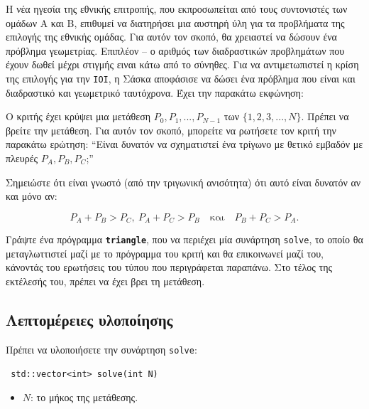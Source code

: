 \documentclass[12pt]{article}
\begin{document}
\renewcommand{\headerLang}{Ελληνικά}
\renewcommand{\problemName}{AB23. TRIANGLE}

\renewcommand{\headerLeft}{IATI Μέρα 2, Senior κατηγορία}
\renewcommand{\headerRightFirst}{XVII INTERNATIONAL ADVANCED TOURNAMENT IN INFORMATICS}
\renewcommand{\headerRightSecond}{ONLINE 2026}

\renewcommand{\tl}{$10$ sec.}
\renewcommand{\ml}{$1024$ MB}
\problem{Πρόβλημα \problemName}

Η νέα ηγεσία της εθνικής επιτροπής, που εκπροσωπείται από τους συντονιστές των ομάδων Α και Β, επιθυμεί να διατηρήσει μια αυστηρή ύλη για τα προβλήματα της επιλογής της εθνικής ομάδας. Για αυτόν τον σκοπό, θα χρειαστεί να δώσουν ένα πρόβλημα γεωμετρίας. Επιπλέον -- ο αριθμός των διαδραστικών προβλημάτων που έχουν δωθεί μέχρι στιγμής ειναι κάτω από το σύνηθες. Για να αντιμετωπιστεί η κρίση της επιλογής για την \texttt{IOI}, η Σάσκα αποφάσισε να δώσει ένα πρόβλημα που είναι και διαδραστικό και γεωμετρικό ταυτόχρονα. Έχει την παρακάτω εκφώνηση:

Ο κριτής έχει κρύψει μια μετάθεση $P_0,P_1,...,P_{N-1}$ των $\{1,2,3,...,N\}$. Πρέπει να βρείτε την μετάθεση. Για αυτόν τον σκοπό, μπορείτε να ρωτήσετε τον κριτή την παρακάτω ερώτηση: ``Είναι δυνατόν να σχηματιστεί ένα τρίγωνο με θετικό εμβαδόν με πλευρές $P_A,P_B,P_C$;''

Σημειώστε ότι είναι γνωστό (από την τριγωνική ανισότητα) ότι αυτό είναι δυνατόν αν και μόνο αν:

\[P_A + P_B > P_C,\ P_A + P_C > P_B \quad \text{και} \quad P_B + P_C > P_A.\]

Γράψτε ένα πρόγραμμα \textbf{\texttt{triangle}}, που να περιέχει μία συνάρτηση \texttt{solve}, το οποίο θα μεταγλωττιστεί μαζί με το πρόγραμμα του κριτή και θα επικοινωνεί μαζί του, κάνοντάς του ερωτήσεις του τύπου που περιγράφεται παραπάνω. Στο τέλος της εκτέλεσής του, πρέπει να έχει βρει τη μετάθεση.

\subsection{Λεπτομέρειες υλοποίησης}
Πρέπει να υλοποιήσετε την συνάρτηση \texttt{solve}:
\begin{lstlisting}
 std::vector<int> solve(int N)
\end{lstlisting}
\begin{itemize}
	\item $N$: το μήκος της μετάθεσης.
\end{itemize}
\end{document}
